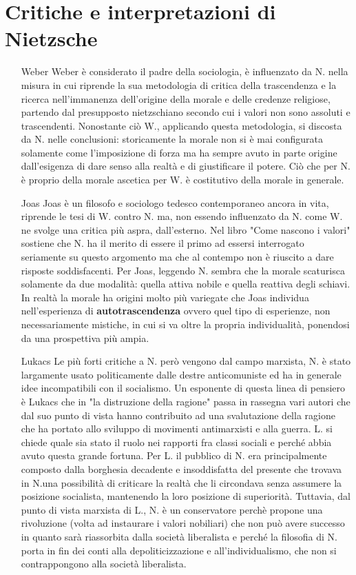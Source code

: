 \documentclass[10pt,a4paper]{article}
\begin{document}
\section{Critiche e interpretazioni di Nietzsche}
\begin{itemize}
\item[Weber]
Weber è considerato il padre della sociologia, è influenzato da N. nella misura in cui riprende la sua metodologia di critica della trascendenza e la ricerca nell'immanenza dell'origine della morale e delle credenze religiose, partendo dal presupposto nietzschiano secondo cui i valori non sono assoluti e trascendenti. Nonostante ciò W., applicando questa metodologia, si discosta da N. nelle conclusioni: storicamente la morale non si è mai configurata solamente come l'imposizione di forza ma ha sempre avuto in parte origine dall'esigenza di dare senso alla realtà e di giustificare il potere. Ciò che per N. è proprio della morale ascetica per W. è costitutivo della morale in generale. 
\item[Joas]
Joas è un filosofo e sociologo tedesco contemporaneo ancora in vita, riprende le tesi di W. contro N. ma, non essendo influenzato da N. come W. ne svolge una critica più aspra, dall'esterno. Nel libro "Come nascono i valori" sostiene che N. ha il merito di essere il primo ad essersi interrogato seriamente su questo argomento ma che al contempo non è riuscito a dare risposte soddisfacenti. Per Joas, leggendo N. sembra che la morale scaturisca solamente da due modalità: quella attiva nobile e quella reattiva degli schiavi. In realtà la morale ha origini molto più variegate che Joas individua nell'esperienza di \textbf{autotrascendenza} ovvero quel tipo di esperienze, non necessariamente mistiche, in cui si va oltre la propria individualità, ponendosi da una prospettiva più ampia.  
\item[Lukacs]
Le più forti critiche a N. però vengono dal campo marxista, N. è stato largamente usato politicamente dalle destre anticomuniste ed ha in generale idee incompatibili con il socialismo. Un esponente di questa linea di pensiero è Lukacs che in "la distruzione della ragione" passa in rassegna vari autori che dal suo punto di vista hanno contribuito ad una svalutazione della ragione che ha portato allo sviluppo di movimenti antimarxisti e alla guerra. L. si chiede quale sia stato il ruolo nei rapporti fra classi sociali e perché abbia avuto questa grande fortuna. Per L. il pubblico di N. era principalmente composto dalla borghesia decadente e insoddisfatta del presente che trovava in N.una possibilità di criticare la realtà che li circondava senza assumere la posizione socialista, mantenendo la loro posizione di superiorità. Tuttavia, dal punto di vista marxista di L., N. è un conservatore perchè propone una rivoluzione (volta ad instaurare i valori nobiliari) che non può avere successo in quanto sarà riassorbita dalla società liberalista e perché la filosofia di N. porta in fin dei conti alla depoliticizzazione e all'individualismo, che non si contrappongono alla società liberalista.\\

\end{itemize}
\end{document}
